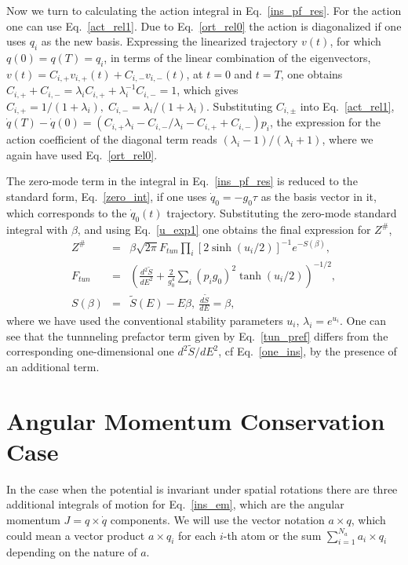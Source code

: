 \documentclass[journal=jpcafh,manuscript=article]{achemso}
\begin{document}
Now we turn to calculating the action integral in
Eq.~\ref{ins_pf_res}. For the action one can use Eq.~\ref{act_rel1}.
Due to Eq.~\ref{ort_rel0} the action is diagonalized if one uses $q_i$
as the new basis. Expressing the linearized trajectory $v(t)$, for which
$q(0)=q(T)=q_i$, in terms of the linear combination of the
eigenvectors, $v(t) = C_{i,+}v_{i,+}(t)+C_{i,-}v_{i, -}(t)$, at $t=0$ and
$t=T$, one obtains
$C_{i,+} + C_{i,-} = \lambda_iC_{i,+}+\lambda_i^{-1}C_{i,-}= 1$, which
gives $C_{i,+}=1/(1+\lambda_i),\;C_{i,-}= \lambda_i/(1+\lambda_i)$.
Substituting $C_{i,\pm}$ into Eq.~\ref{act_rel1},
$\dot{q}(T)-\dot{q}(0)=(C_{i,+}\lambda_i-C_{i,-}/\lambda_i-C_{i,+}+C_{i,-})p_i$,
the expression for the action coefficient of the diagonal term reads
$(\lambda_i - 1)/(\lambda_i + 1)$, where we again have used
Eq.~\ref{ort_rel0}.

The zero-mode term in the integral in Eq.~\ref{ins_pf_res} is reduced
to the standard form, Eq.~\ref{zero_int}, if one uses
$\dot{q}_0=-g_0\tau$ as the basis vector in it, which corresponds to
the $\dot{q}_0(t)$ trajectory.  Substituting the zero-mode standard
integral with $\beta$, and using Eq.~\ref{u_exp1} one obtains the
final expression for $Z^\#$,
\begin{eqnarray}
  \label{multi_ins}
  Z^\#&=&\beta\sqrt{2\pi}F_{tun}\prod_i[2\sinh(u_i/2)]^{-1}e^{-S(\beta)},
  \\
  \label{tun_pref}
  F_{tun}&=&\left(\frac{d^2\tilde{S}}{dE^2}+\frac{2}{g_0^4}\sum_i
             (p_ig_0)^2\tanh(u_i/2)\right)^{-1/2},
  \\
  \label{s0}
  S(\beta)&=&\tilde{S}(E)-E\beta,\ \frac{d\tilde{S}}{dE}=\beta,
\end{eqnarray}
where we have used the conventional stability parameters $u_i$,
$\lambda_i=e^{u_i}$.  One can see that the tunnneling prefactor term given
by Eq.~\ref{tun_pref} differs from the corresponding one-dimensional
one $d^2\tilde{S}/dE^2$, cf Eq.~\ref{one_ins}, by the presence of an
additional term.

\setcounter{equation}{0}
\section{Angular Momentum Conservation Case}
In the case when the potential is invariant under spatial rotations
there are three additional integrals of motion for Eq.~\ref{ins_em},
which are the angular momentum $J=q\times \dot{q}$ components. We will
use the vector notation $a\times q$, which could mean a vector product
$a\times q_i$ for each $i$-th atom or the sum
$\sum_{i=1}^{N_a}a_i\times q_i$ depending on the nature of $a$.
\end{document}
